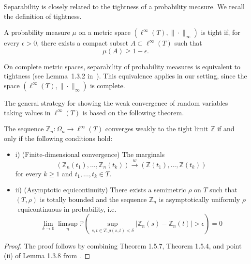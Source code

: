Separability is closely related to the tightness of a probability measure. We recall the definition of tightness.

\begin{definition}[Tightness]\label{def::tight_probmeasure}
A probability measure $\mu$ on a metric space $(\ell^\infty(T), \|\cdot \|_\infty)$ is tight if, for every $\epsilon > 0$, there exists a compact subset $A \subset \ell^\infty(T)$ such that
\[
\mu\left(A\right) \geq 1 - \epsilon.
\]
\end{definition}
On complete metric spaces, separability of probability measures is equivalent to tightness (see Lemma~1.3.2 in~\cite{van1996weak}). This equivalence applies in our setting, since the space $\left(\ell^\infty(T), \|\cdot\|_\infty\right)$ is complete.

The general strategy for showing the weak convergence of random variables taking values in $\ell^\infty(T)$ is based on the following theorem.
\begin{theorem}\label{theorem::weak_conv_stochproc}
    The sequence $\mathbb{Z}_n : \Omega_n \to \ell^\infty(T)$ converges weakly to the tight limit $\mathbb{Z}$ if and only if the following conditions hold:
    \begin{itemize}
        \item i) (Finite-dimensional convergence) The marginals 
        \[
        \left(\mathbb{Z}_n(t_1),\dots, \mathbb{Z}_n(t_k)\right) \overset{w}{\to} \left(\mathbb{Z}(t_1),\dots,\mathbb{Z}(t_k)\right)
        \] for every $k\geq 1$ and $t_1,\dots,t_k \in T.$
        \item ii) (Asymptotic equicontinuity) There exists a semimetric $\rho$ on $T$ such that $(T,\rho)$ is totally bounded and the sequence $\mathbb{Z}_n$ is asymptotically uniformly $\rho$-equicontinuous in probability, i.e.
        \[
        \lim_{\delta \to 0} \limsup_{n} \mathbb{P}\left( \sup_{s,t\in T, \rho(s,t)<\delta} \left| \mathbb{Z}_n(s)-\mathbb{Z}_n(t) \right| > \epsilon\right) = 0
        \]
    \end{itemize}
\end{theorem}
\begin{proof}
    The proof follows by combining Theorem 1.5.7, Theorem 1.5.4, and point (ii) of Lemma 1.3.8 from \cite{van1996weak}.
\end{proof}

